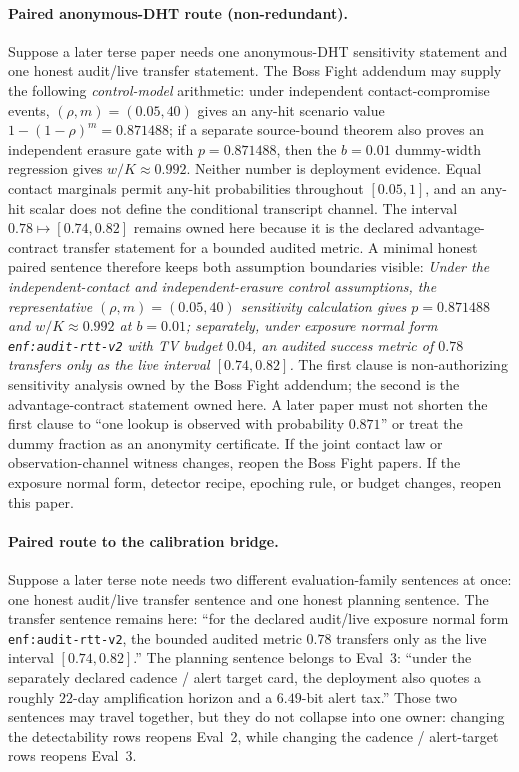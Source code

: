 \documentclass[11pt]{article}
\begin{document}
\paragraph{Paired anonymous-DHT route (non-redundant).}
Suppose a later terse paper needs one anonymous-DHT sensitivity statement and one honest audit/live transfer statement.
The Boss Fight addendum may supply the following \emph{control-model} arithmetic: under independent contact-compromise events, $(\rho,m)=(0.05,40)$ gives an any-hit scenario value $1-(1-\rho)^m=0.871488$; if a separate source-bound theorem also proves an independent erasure gate with $p=0.871488$, then the $b=0.01$ dummy-width regression gives $w/K\approx0.992$.\cite{series:bossfightBaddendum}
Neither number is deployment evidence. Equal contact marginals permit any-hit probabilities throughout $[0.05,1]$, and an any-hit scalar does not define the conditional transcript channel.
The interval $0.78 \mapsto [0.74,0.82]$ remains owned here because it is the declared advantage-contract transfer statement for a bounded audited metric.
A minimal honest paired sentence therefore keeps both assumption boundaries visible: \emph{Under the independent-contact and independent-erasure control assumptions, the representative $(\rho,m)=(0.05,40)$ sensitivity calculation gives $p=0.871488$ and $w/K\approx0.992$ at $b=0.01$; separately, under exposure normal form \texttt{enf:audit-rtt-v2} with TV budget $0.04$, an audited success metric of $0.78$ transfers only as the live interval $[0.74,0.82]$.}
The first clause is non-authorizing sensitivity analysis owned by the Boss Fight addendum; the second is the advantage-contract statement owned here.
A later paper must not shorten the first clause to ``one lookup is observed with probability $0.871$'' or treat the dummy fraction as an anonymity certificate.
If the joint contact law or observation-channel witness changes, reopen the Boss Fight papers. If the exposure normal form, detector recipe, epoching rule, or budget changes, reopen this paper.\cite{series:bossfightBaddendum}

\paragraph{Paired route to the calibration bridge.}
Suppose a later terse note needs two different evaluation-family sentences at once: one honest audit/live transfer sentence and one honest planning sentence.
The transfer sentence remains here: ``for the declared audit/live exposure normal form \texttt{enf:audit-rtt-v2}, the bounded audited metric $0.78$ transfers only as the live interval $[0.74,0.82]$.''
The planning sentence belongs to Eval~3: ``under the separately declared cadence / alert target card, the deployment also quotes a roughly $22$-day amplification horizon and a $6.49$-bit alert tax.''
Those two sentences may travel together, but they do not collapse into one owner: changing the detectability rows reopens Eval~2, while changing the cadence / alert-target rows reopens Eval~3.
\end{document}
